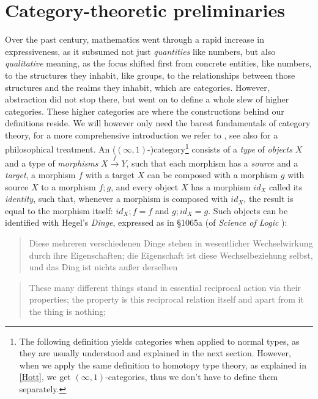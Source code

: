 \documentclass{article}
\begin{document}
\section{Category-theoretic preliminaries}
Over the past century, mathematics went through a rapid increase in expressiveness, as it subsumed not
just \emph{quantities} like numbers, but also \emph{qualitative} meaning, as the focus shifted first from
concrete entities, like numbers, to the structures they inhabit, like groups, to the relationships between
those structures and the realms they inhabit, which are categories. However, abstraction did not stop
there, but went on to define a whole slew of higher categories. These higher categories are where the
constructions behind our definitions reside. We will however only need the barest fundamentals of category
theory, for a more comprehensive introduction we refer to \cite{Lein}, see also \cite{CPhil} for a philosophical
treatment. An ($(\infty, 1)$-)category\footnote{The following definition yields categories when applied
to normal types, as they are usually understood and explained in the next section. However, when we apply
the same definition to homotopy type theory, as explained in \ref{Hott}, we get $(\infty,1)$-categories,
thus we don't have to define them separately.} consists of a \emph{type} of \emph{objects} $X$ and a type
of \emph{morphisms} $X\xrightarrow{f} Y$, such that each morphism has a \emph{source} and a \emph{target},
a morphism $f$ with a target $X$ can be composed with a morphism $g$ with source $X$ to a morphism $f;g$,
and every object $X$ has a morphism $id_X$ called its \emph{identity}, such that, whenever a morphism
is composed with $id_X$, the result is equal to the morphism itself: $id_X;f=f$ and $g;id_X=g$. Such objects
can be identified with Hegel's \emph{Dinge}, expressed as in §1065a (of \emph{Science of Logic} \cite{Sol}):


\begin{quote}
    Diese mehreren verschiedenen Dinge stehen in wesentlicher Wechselwirkung durch ihre Eigenschaften;
die Eigenschaft ist diese Wechselbeziehung selbst, und das Ding ist nichts außer derselben
\end{quote}

\begin{quote}
    These many different things stand in essential reciprocal action via their properties; the property
is this reciprocal relation itself and apart from it the thing is nothing;
\end{quote}
\end{document}
